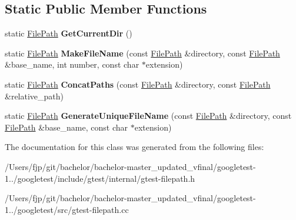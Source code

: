 \subsection*{Static Public Member Functions}
\begin{DoxyCompactItemize}
\item 
\mbox{\label{classtesting_1_1internal_1_1_file_path_aaff39ccd7bfb7a1c09c0220a64326387}} 
static \mbox{\hyperlink{classtesting_1_1internal_1_1_file_path}{File\+Path}} {\bfseries Get\+Current\+Dir} ()
\item 
\mbox{\label{classtesting_1_1internal_1_1_file_path_aa8c102da670261eb4fa8e2f2481df139}} 
static \mbox{\hyperlink{classtesting_1_1internal_1_1_file_path}{File\+Path}} {\bfseries Make\+File\+Name} (const \mbox{\hyperlink{classtesting_1_1internal_1_1_file_path}{File\+Path}} \&directory, const \mbox{\hyperlink{classtesting_1_1internal_1_1_file_path}{File\+Path}} \&base\+\_\+name, int number, const char $\ast$extension)
\item 
\mbox{\label{classtesting_1_1internal_1_1_file_path_ac9d57987f60ac43f0c57b89e333e531e}} 
static \mbox{\hyperlink{classtesting_1_1internal_1_1_file_path}{File\+Path}} {\bfseries Concat\+Paths} (const \mbox{\hyperlink{classtesting_1_1internal_1_1_file_path}{File\+Path}} \&directory, const \mbox{\hyperlink{classtesting_1_1internal_1_1_file_path}{File\+Path}} \&relative\+\_\+path)
\item 
\mbox{\label{classtesting_1_1internal_1_1_file_path_a2280a77adb394cf80bb5f73fc292e8c8}} 
static \mbox{\hyperlink{classtesting_1_1internal_1_1_file_path}{File\+Path}} {\bfseries Generate\+Unique\+File\+Name} (const \mbox{\hyperlink{classtesting_1_1internal_1_1_file_path}{File\+Path}} \&directory, const \mbox{\hyperlink{classtesting_1_1internal_1_1_file_path}{File\+Path}} \&base\+\_\+name, const char $\ast$extension)
\end{DoxyCompactItemize}


The documentation for this class was generated from the following files\+:\begin{DoxyCompactItemize}
\item 
/\+Users/fjp/git/bachelor/bachelor-\/master\+\_\+updated\+\_\+vfinal/googletest-\/1../googletest/include/gtest/internal/gtest-\/filepath.\+h\item 
/\+Users/fjp/git/bachelor/bachelor-\/master\+\_\+updated\+\_\+vfinal/googletest-\/1../googletest/src/gtest-\/filepath.\+cc\end{DoxyCompactItemize}
